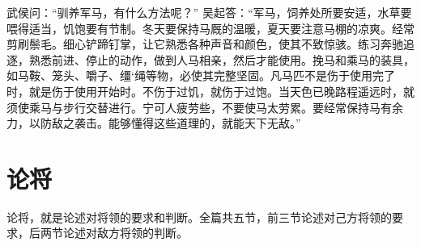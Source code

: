 \documentclass[a4paper,12pt,UTF8,twoside]{ctexbook}
\begin{document}
武侯问：“驯养军马，有什么方法呢？”
吴起答：“军马，饲养处所要安适，水草要喂得适当，饥饱要有节制。冬天要保持马厩的温暖，夏天要注意马棚的凉爽。经常剪刷鬃毛。细心铲蹄钉掌，让它熟悉各种声音和颜色，使其不致惊骇。练习奔驰追逐，熟悉前进、停止的动作，做到人马相亲，然后才能使用。挽马和乘马的装具，如马鞍、笼头、嚼子、缰‘绳等物，必使其完整坚固。凡马匹不是伤于使用完了时，就是伤于使用开始时。不伤于过饥，就伤于过饱。当天色已晚路程遥远时，就须使乘马与步行交替进行。宁可人疲劳些，不要使马太劳累。要经常保持马有余力，以防敌之袭击。能够懂得这些道理的，就能天下无敌。”

\chapter{论将}

论将，就是论述对将领的要求和判断。全篇共五节，前三节论述对己方将领的要求，后两节论述对敌方将领的判断。
\end{document}
